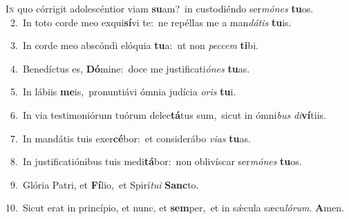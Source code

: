 \lettrine{\initial\textcolor{\initialcolor}{I}}{n} quo córrigit adolescéntior viam \textbf{su}\-am?~\star in custodiéndo ser\-\textit{mó}\-\textit{nes} \textbf{tu}\-os.\\
{\numbfont\textcolor{\numbcolor}{~2.}}~In toto corde meo exqui\-\textbf{sí}\-vi te:~\star ne repéllas me a man\-\textit{dá}\-\textit{tis} \textbf{tu}\-is.\par
{\numbfont\textcolor{\numbcolor}{~3.}}~In corde meo abscóndi elóquia \textbf{tu}\-a:~\star ut non \textit{pec}\-\textit{cem} \textbf{ti}\-bi.\par
{\numbfont\textcolor{\numbcolor}{~4.}}~Benedíctus es, \textbf{Dó}\-mine:~\star doce me justificati\-\textit{ó}\-\textit{nes} \textbf{tu}\-as.\par
{\numbfont\textcolor{\numbcolor}{~5.}}~In lábiis \textbf{me}\-is,~\star pronuntiávi ómnia judícia \textit{o}\-\textit{ris} \textbf{tu}\-i.\par
{\numbfont\textcolor{\numbcolor}{~6.}}~In via testimoniórum tuórum delec\-\textbf{tá}\-tus sum,~\star sicut in ómni\textit{bus} \textit{di}\-\textbf{ví}tiis.\par
{\numbfont\textcolor{\numbcolor}{~7.}}~In mandátis tuis exer\-\textbf{cé}\-bor:~\star et considerábo \textit{vi}\-\textit{as} \textbf{tu}\-as.\par
{\numbfont\textcolor{\numbcolor}{~8.}}~In justificatiónibus tuis medi\-\textbf{tá}\-bor:~\star non oblivíscar ser\-\textit{mó}\-\textit{nes} \textbf{tu}\-os.\par
{\numbfont\textcolor{\numbcolor}{~9.}}~Glória Patri, et \textbf{Fí}\-lio,~\star et Spirí\-\textit{tu}\-\textit{i} \textbf{Sanc}\-to.\par
{\numbfont\textcolor{\numbcolor}{10.}}~Sicut erat in princípio, et nunc, et \textbf{sem}\-per,~\star et in sǽcula sæcu\-\textit{ló}\-\textit{rum}. \textbf{A}\-men.\par

